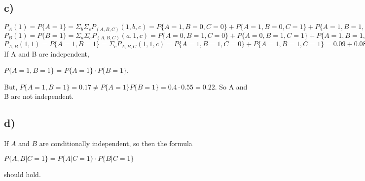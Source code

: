 \documentclass[12pt]{article}
\begin{document}
\subsection*{c)}
$P_{A}(1) = P\{A = 1\} =\Sigma_{b} \Sigma_{c} P_{(A, B, C)} (1, b, c) = P\{A = 1, B =0, C=0\} + P\{A=1, B=0, C=1\} + P\{A =1, B=1, C=0\} + P\{A=1, B=1, C=1\} = 0.06+ 0.32+ 0.09 + 0.08 = 0.55$ \\

$P_{B}(1) =P\{B = 1\} = \Sigma_{a} \Sigma_{c} P_{(A, B, C)} (a, 1, c) = P\{A = 0, B=1, C=0\} + P\{A=0, B=1, C=1\}+ P\{A=1, B=1, C=0\}+ P\{A=1, B=1, C=1\} = 0.21 + 0.02 + 0.09+ 0.08 = 0.4$ \\

$P_{A, B}(1, 1) = P\{A = 1, B = 1\} = \Sigma_{c}P_{A, B, C} (1, 1, c) = P\{A = 1,B=1,C=0\} + P\{A=1,B=1,C=1\} = 0.09 + 0.08 = 0.17$\\

If A and B are independent, \begin{center}
    $P\{A = 1, B = 1\}$ = $P\{A = 1\} \cdot P\{B=1\}$.
\end{center} But, $P\{A = 1, B = 1\} = 0.17 \neq P\{A= 1\}P\{B=1\} = 0.4 \cdot 0.55 = 0.22$. So A and B are not independent.
\subsection*{d)}
If $A$ and $B$ are conditionally independent, so then the formula \begin{center}
    $P\{A , B | C = 1\} = P\{A|C = 1\} \cdot P\{B|C = 1\}$
\end{center} should hold.\\ \\
\end{document}
